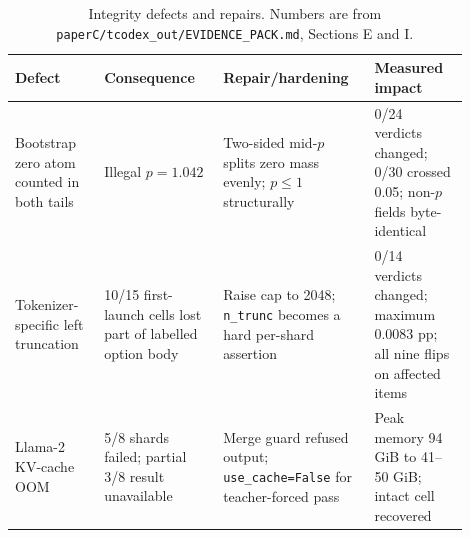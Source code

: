 \begin{table}[t]
\centering
\small
\setlength{\tabcolsep}{4.2pt}
\begin{tabular}{p{0.18\linewidth}p{0.24\linewidth}p{0.29\linewidth}p{0.19\linewidth}}
\toprule
Defect & Consequence & Repair/hardening & Measured impact \\
\midrule
Bootstrap zero atom counted in both tails & Illegal $p=1.042$ & Two-sided mid-$p$ splits zero mass evenly; $p\leq1$ structurally & 0/24 verdicts changed; 0/30 crossed 0.05; non-$p$ fields byte-identical \\
Tokenizer-specific left truncation & 10/15 first-launch cells lost part of labelled option body & Raise cap to 2048; \texttt{n\_trunc} becomes a hard per-shard assertion & 0/14 verdicts changed; maximum 0.0083 pp; all nine flips on affected items \\
Llama-2 KV-cache OOM & 5/8 shards failed; partial 3/8 result unavailable & Merge guard refused output; \texttt{use\_cache=False} for teacher-forced pass & Peak memory 94 GiB to 41--50 GiB; intact cell recovered \\
\bottomrule
\end{tabular}
\caption{Integrity defects and repairs. Numbers are from \texttt{paperC/tcodex\_out/EVIDENCE\_PACK.md}, Sections E and I.}
\label{tab:integrity}
\end{table}
